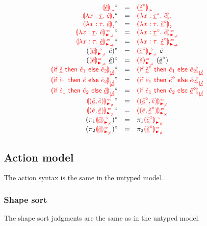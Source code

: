 \documentclass[formalism.tex]{subfiles}
\begin{document}
\[\begin{array}{rcl}
  \cursorErasesToRow{\ZCInconType{\ZCMV}}{\ECInconType{\cursorErase{\ZCMV}}} \\
  \cursorErasesToRow{\ZCLamInconAscT{x}{\ZTMV}{\ECMV}}{\ECLamInconAsc{x}{\cursorErase{\ZTMV}}{\ECMV}} \\
  \cursorErasesToRow{\ZCLamInconAscE{x}{\TMV}{\ZCMV}}{\ECLamInconAsc{x}{\TMV}{\cursorErase{\ZCMV}}} \\
  \cursorErasesToRow{\ZCLamAnaNonMatchedArrowT{x}{\ZTMV}{\ECMV}}{\ECLamAnaNonMatchedArrow{x}{\cursorErase{\ZTMV}}{\ECMV}} \\
  \cursorErasesToRow{\ZCLamAnaNonMatchedArrowE{x}{\TMV}{\ZCMV}}{\ECLamAnaNonMatchedArrow{x}{\TMV}{\cursorErase{\ZCMV}}} \\
  \cursorErasesToRow{(\ZCApSynNonMatchedArrowL{\ZCMV}{\ECMV})}{\ECApSynNonMatchedArrow{\cursorErase{\ZCMV}}{\ECMV}} \\
  \cursorErasesToRow{(\ZCApSynNonMatchedArrowR{\ECMV}{\ZCMV})}{\ECApSynNonMatchedArrow{\ECMV}{(\cursorErase{\ZCMV})}} \\
  \cursorErasesToRow{\ZCInconBrC{\ZCMV}{\ECMV_1}{\ECMV_2}}{\ECInconBr{\cursorErase{\ZCMV}}{\ECMV_1}{\ECMV_2}} \\
  \cursorErasesToRow{\ZCInconBrL{\ECMV_1}{\ZCMV}{\ECMV_2}}{\ECInconBr{\ECMV_1}{\cursorErase{\ZCMV}}{\ECMV_2}} \\
  \cursorErasesToRow{\ZCInconBrR{\ECMV_1}{\ECMV_2}{\ZCMV}}{\ECInconBr{\ECMV_1}{\ECMV_2}{\cursorErase{\ZCMV}}} \\
  \cursorErasesToRow{\ZCPairAnaNonMatchedProdL{\ZCMV}{\ECMV}}{\ECPairAnaNonMatchedProd{\cursorErase{\ZCMV}}{\ECMV}} \\
  \cursorErasesToRow{\ZCPairAnaNonMatchedProdR{\ECMV}{\ZCMV}}{\ECPairAnaNonMatchedProd{\ECMV}{\cursorErase{\ZCMV}}} \\
  \cursorErasesToRow{(\ZCProjLSynNonMatchedProd{\ZCMV})}{\ECProjLSynNonMatchedProd{\cursorErase{\ZCMV}}} \\
  \cursorErasesToRow{(\ZCProjRSynNonMatchedProd{\ZCMV})}{\ECProjRSynNonMatchedProd{\cursorErase{\ZCMV}}} \\
\end{array}\]

\subsection{Action model}
\label{sec:typed-action-model}
The action syntax is the same in the untyped model.

\subsubsection{Shape sort}
\label{sec:typed-shape-sort}
The shape sort judgments are the same as in the untyped model.
\end{document}
